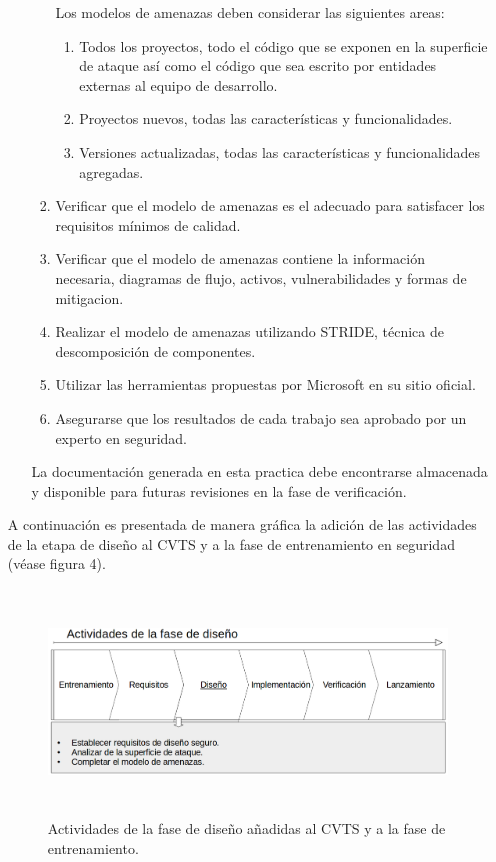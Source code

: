 \documentclass[runningheads,a4paper]{llncs}
\begin{document}
\begin{enumerate}
\begin{enumerate}
\begin{enumerate}
	Los modelos de amenazas deben considerar las siguientes areas: \\
	
	\begin{enumerate}
		\item Todos los proyectos, todo el código que se exponen en la superficie de ataque así como el código que sea escrito por entidades externas al equipo de desarrollo. 
		\item Proyectos nuevos, todas las características y funcionalidades.
		\item Versiones actualizadas, todas las características y funcionalidades agregadas.\\
	\end{enumerate}
	\item Verificar que el modelo de amenazas es el adecuado para satisfacer los requisitos mínimos de calidad.
	\item Verificar que el modelo de amenazas contiene la información necesaria, diagramas de flujo, activos, vulnerabilidades y formas de mitigacion.
	\item Realizar el modelo de amenazas utilizando \gls{STRIDE}, técnica de descomposición de componentes.
	\item Utilizar las herramientas propuestas por Microsoft en su sitio oficial.
	\item Asegurarse que los resultados de cada trabajo sea aprobado por un experto en seguridad. \\
\end{enumerate}

La documentación generada en esta practica debe encontrarse almacenada y disponible para futuras revisiones en la fase de verificación. \\

\end{enumerate}

A continuación es presentada de manera gráfica la adición de las actividades de la etapa de diseño al \gls{CVTS} y a la fase de entrenamiento en seguridad (véase figura 4).\\

\begin{figure}
\centering
\includegraphics[height=6.0cm, width=12.0cm]{sa_figura_4}
\caption{Actividades de la fase de diseño añadidas al \gls{CVTS} y a la fase de entrenamiento.}
\label{fig:example}
\end{figure}


\end{enumerate}
\end{document}
